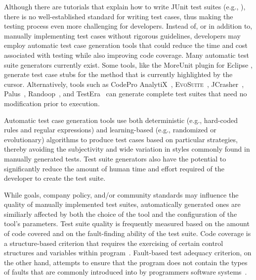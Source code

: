 

Although there are tutorials that explain how to write JUnit test suites (e.g., \cite{vogella2013}), there is no well-established standard for writing test cases, thus making the testing process even more challenging for developers.  Instead of, or in addition to, manually implementing test cases without rigorous guidelines, developers may employ automatic test case generation tools that could reduce the time and cost associated with testing while also improving code coverage.  Many automatic test suite generators currently exist.  Some tools, like the MoreUnit plugin for Eclipse \cite{moreunit}, generate test case stubs for the method that is currently highlighted by the cursor.  Alternatively, tools such as CodePro AnalytiX~\cite{codepro1}, \textsc{EvoSuite}~\cite{fraser:2011:eat:2025113.2025179}, JCrasher~\cite{csallner2004}, Palus~\cite{zhang:2011:pha:1985793.1986036}, Randoop~\cite{pacheco2007feedback}, and TestEra~\cite{marinov:2001:tnf:872023.872551} can generate complete test suites that need no modification prior to execution.




Automatic test case generation tools use both deterministic (e.g., hard-coded rules and regular expressions) and
learning-based (e.g., randomized or evolutionary) algorithms to produce test cases based on particular strategies,
thereby avoiding the subjectivity and wide variation in styles commonly found in manually generated tests.  Test suite
generators also have the potential to significantly reduce the amount of human time and effort required of the developer
to create the test suite.  


While goals, company policy, and/or community standards may influence the quality of manually implemented test suites, automatically generated ones are similiarly affected by both the choice of the tool and the configuration of the tool's parameters.  Test suite quality is frequently measured based on the amount of code covered and on the fault-finding ability of the test suite.  Code coverage is a structure-based criterion that requires the exercising of certain control structures and variables within program~\cite{kapfhammer-testing-handbook}. Fault-based test adequacy criterion, on the other hand, attempts to ensure that the program does not contain the types of faults that are commonly introduced into by programmers software systems~\cite{demillo1978hints, zhu1997software}.  

